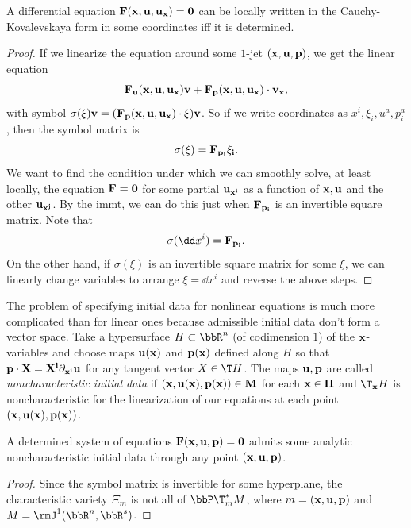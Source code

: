 \begin{lem}
    A differential equation $\bf{F}(\bf{x},\bf{u},\bf{u}_{\bf x})=0$ can be locally written in the Cauchy-Kovalevskaya form in some coordinates iff it is determined.
\end{lem}
\begin{proof}
    If we linearize the equation around some $1$-jet $(\bf{x},\bf{u},\bf{p})$, we get the linear equation 
    \[\bf{F}_{\bf{u}}(\bf{x},\bf{u},\bf{u}_{\bf x})\bf{v}+\bf{F}_{\bf p}(\bf{x},\bf{u},\bf{u}_{\bf x})\cdot \bf{v}_{\bf x},\]
    with symbol $\sigma(\xi)\bf{v}=(\bf{F}_{\bf p}(\bf{x},\bf{u},\bf{u}_{\bf x})\cdot \xi) \bf{v}$. So if we write coordinates as $x^i,\xi_i,u^a,p^a_i$, then the symbol matrix is 
    \[\sigma(\xi)=\bf{F}_{p_i}\xi_i.\]
    We want to find the condition under which we can smoothly solve, at least locally, the equation $\bf{F}=0$ for some partial $\bf{u}_{x^i}$ as a function of $\bf{x},\bf{u}$ and the other $\bf{u}_{x^j}$. By the \gls{immt}, we can do this just when $\bf{F}_{p_i}$ is an invertible square matrix. Note that 
    \[\sigma(\dd x^i)=\bf{F}_{p_i}.\]
    On the other hand, if $\sigma(\xi)$ is an invertible square matrix for some $\xi$, we can linearly change variables to arrange $\xi=\dd x^i$ and reverse the above steps.
\end{proof}

The problem of specifying initial data for nonlinear equations is much more complicated than for linear ones because admissible initial data don't form a vector space. Take a hypersurface $H\subset\bbR^n$ (of codimension $1$) of the $\bf{x}$-variables and choose maps $\bf{u}(\bf{x})$ and $\bf{p}(\bf{x})$ defined along $H$ so that $\bf{p}\cdot X=X^i\partial_{x^i}\bf{u}$ for any tangent vector $X\in \T H$. The maps $\bf{u},\bf{p}$ are called \emph{noncharacteristic initial data} if $(\bf{x},\bf{u}(\bf{x}),\bf{p}(\bf{x}))\in M$ for each $\bf{x}\in H$ and $\T_{\bf{x}}H$ is noncharacteristic for the linearization of our equations at each point $(\bf{x},\bf{u}(\bf{x}),\bf{p}(\bf{x}))$.

\begin{lem}
    A determined system of equations $\bf{F}(\bf{x},\bf{u},\bf{p})=0$ admits some analytic noncharacteristic initial data through any point $(\bf{x},\bf{u},\bf{p})$.
\end{lem}
\begin{proof}
    Since the symbol matrix is invertible for some hyperplane, the characteristic variety $\Xi_m$ is not all of $\bbP \T^\ast_m M$, where $m=(\bf{x},\bf{u},\bf{p})$ and $M=\rmJ^1(\bbR^n,\bbR^s)$.
\end{proof}

